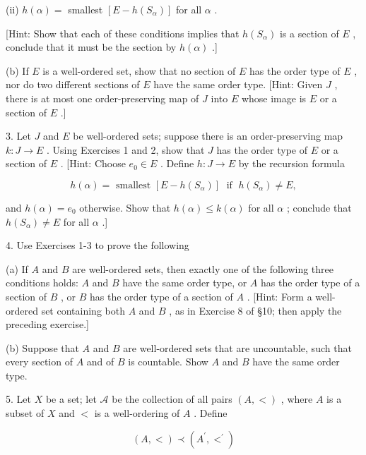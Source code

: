 \documentclass[10pt]{article}
\begin{document}
(ii) \(h\left( \alpha \right)  =\) smallest \(\left\lbrack  {E - h\left( {S}_{\alpha }\right) }\right\rbrack\) for all \(\alpha\) .

[Hint: Show that each of these conditions implies that \(h\left( {S}_{\alpha }\right)\) is a section of \(E\) , conclude that it must be the section by \(h\left( \alpha \right)\) .]

(b) If \(E\) is a well-ordered set, show that no section of \(E\) has the order type of \(E\) , nor do two different sections of \(E\) have the same order type. [Hint: Given \(J\) , there is at most one order-preserving map of \(J\) into \(E\) whose image is \(E\) or a section of \(E\) .]

3. Let \(J\) and \(E\) be well-ordered sets; suppose there is an order-preserving map \(k : J \rightarrow  E\) . Using Exercises 1 and 2, show that \(J\) has the order type of \(E\) or a section of \(E\) . [Hint: Choose \({e}_{0} \in  E\) . Define \(h : J \rightarrow  E\) by the recursion formula

\[
h\left( \alpha \right)  = \text{ smallest }\left\lbrack  {E - h\left( {S}_{\alpha }\right) }\right\rbrack  \;\text{ if }\;h\left( {S}_{\alpha }\right)  \neq  E,
\]

and \(h\left( \alpha \right)  = {e}_{0}\) otherwise. Show that \(h\left( \alpha \right)  \leq  k\left( \alpha \right)\) for all \(\alpha\) ; conclude that \(h\left( {S}_{\alpha }\right)  \neq  E\) for all \(\alpha\) .]

4. Use Exercises 1-3 to prove the following

(a) If \(A\) and \(B\) are well-ordered sets, then exactly one of the following three conditions holds: \(A\) and \(B\) have the same order type, or \(A\) has the order type of a section of \(B\) , or \(B\) has the order type of a section of \(A\) . [Hint: Form a well-ordered set containing both \(A\) and \(B\) , as in Exercise 8 of §10; then apply the preceding exercise.]

(b) Suppose that \(A\) and \(B\) are well-ordered sets that are uncountable, such that every section of \(A\) and of \(B\) is countable. Show \(A\) and \(B\) have the same order type.

5. Let \(X\) be a set; let \(\mathcal{A}\) be the collection of all pairs \(\left( {A, < }\right)\) , where \(A\) is a subset of \(X\) and \(<\) is a well-ordering of \(A\) . Define

\[
\left( {A, < }\right)  \prec  \left( {{A}^{\prime },{ < }^{\prime }}\right)
\]
\end{document}
